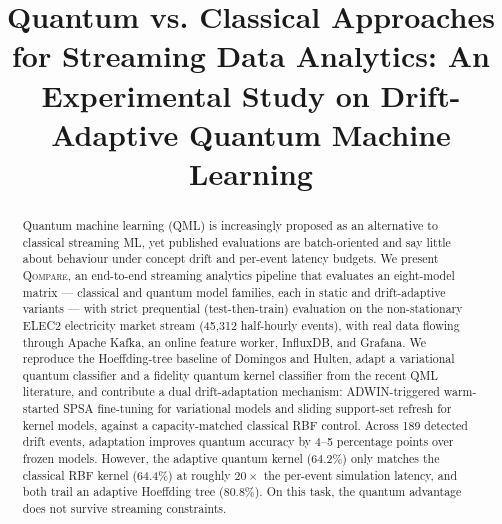\documentclass[conference]{IEEEtran}
\begin{document}
\title{Quantum vs. Classical Approaches for Streaming Data Analytics: An Experimental Study on Drift-Adaptive Quantum Machine Learning}

\author{%
\and
{}
\and
{}
\and
{}
}

\maketitle

\begin{abstract}
Quantum machine learning (QML) is increasingly proposed as an alternative to classical
streaming ML, yet published evaluations are batch-oriented and say little about behaviour
under concept drift and per-event latency budgets. We present \textsc{Qompare}, an
end-to-end streaming analytics pipeline that evaluates an eight-model matrix --- classical
and quantum model families, each in static and drift-adaptive variants --- with strict
prequential (test-then-train) evaluation on the non-stationary ELEC2 electricity market
stream (45{,}312 half-hourly events), with real data flowing through Apache Kafka, an
online feature worker, InfluxDB, and Grafana. We reproduce the Hoeffding-tree baseline of
Domingos and Hulten, adapt a variational quantum classifier and a fidelity quantum kernel
classifier from the recent QML literature, and contribute a dual drift-adaptation
mechanism: ADWIN-triggered warm-started SPSA fine-tuning for variational models and
sliding support-set refresh for kernel models, against a capacity-matched classical RBF
control. Across 189 detected drift events, adaptation improves quantum accuracy by
4--5 percentage points over frozen models. However, the adaptive quantum kernel (64.2\%)
only matches the classical RBF kernel (64.4\%) at roughly $20\times$ the per-event
simulation latency, and both trail an adaptive Hoeffding tree (80.8\%). On this task, the
quantum advantage does not survive streaming constraints.
\end{abstract}
\end{document}
